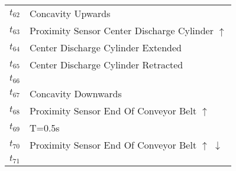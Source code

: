 \begin{table}[H]
\begin{tabular}{M{5cm}M{10cm}}
\hyperlink{partialNet:t62}{\hypertarget{partialTable:t62}{$t_{62}$}} & Concavity Upwards\\
\hyperlink{partialNet:t63}{\hypertarget{partialTable:t63}{$t_{63}$}} & Proximity Sensor Center Discharge Cylinder \(\uparrow\)\\
\hyperlink{partialNet:t64}{\hypertarget{partialTable:t64}{$t_{64}$}} & Center Discharge Cylinder Extended\\
\hyperlink{partialNet:t65}{\hypertarget{partialTable:t65}{$t_{65}$}} & Center Discharge Cylinder Retracted\\
\hyperlink{partialNet:t66}{\hypertarget{partialTable:t66}{$t_{66}$}} & \\
\hyperlink{partialNet:t67}{\hypertarget{partialTable:t67}{$t_{67}$}} & Concavity Downwards\\
\hyperlink{partialNet:t68}{\hypertarget{partialTable:t68}{$t_{68}$}} & Proximity Sensor End Of Conveyor Belt \(\uparrow\)\\
\hyperlink{partialNet:tt69}{\hypertarget{partialTable:tt69}{$t_{69}$}} & T=0.5s\\
\hyperlink{partialNet:t70}{\hypertarget{partialTable:t70}{$t_{70}$}} & Proximity Sensor End Of Conveyor Belt \(\uparrow\)       \(\downarrow\)\\
\hyperlink{partialNet:t71}{\hypertarget{partialTable:t71}{$t_{71}$}} & \\
\end{tabular}
\end{table}
